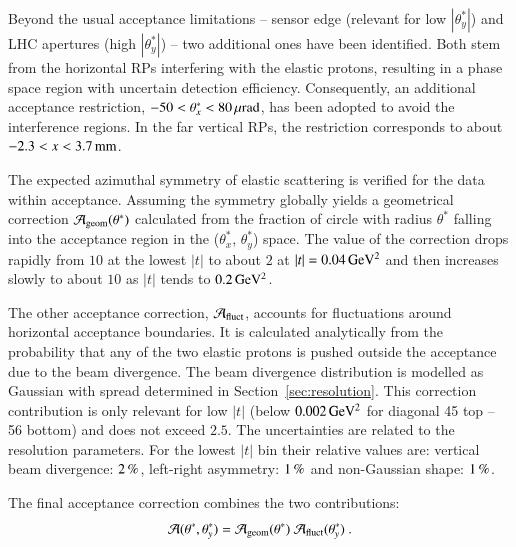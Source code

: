 Beyond the usual acceptance limitations -- sensor edge (relevant for low $|\theta^*_y|$) and LHC apertures (high $|\theta_y^*|$) -- two additional ones have been identified. Both stem from the horizontal RPs interfering with the elastic protons, resulting in a phase space region with uncertain detection efficiency. Consequently, an additional acceptance restriction, $-50 < \theta_x^* < 80\,{\rm \mu rad}$, has been adopted to avoid the interference regions. In the far vertical RPs, the restriction corresponds to about $-2.3 < x < 3.7\,{\rm mm}$.

The expected azimuthal symmetry of elastic scattering is verified for the data within acceptance. Assuming the symmetry globally yields a geometrical correction ${\cal A}_{\rm geom}(\theta^*)$ calculated from the fraction of circle with radius $\theta^*$ falling into the acceptance region in the ($\theta_x^*$, $\theta_y^*$) space. The value of the correction drops rapidly from $10$ at the lowest $|t|$ to about $2$ at $|t| = 0.04\,{\rm GeV^2}$ and then increases slowly to about $10$ as $|t|$ tends to $0.2\,{\rm GeV^2}$.

The other acceptance correction, ${\cal A}_{\rm fluct}$, accounts for fluctuations around horizontal acceptance boundaries. It is calculated analytically from the probability that any of the two elastic protons is pushed outside the acceptance due to the beam divergence. The beam divergence distribution is modelled as Gaussian with spread determined in Section~\ref{sec:resolution}. This correction contribution is only relevant for low $|t|$ (below $0.002\,{\rm GeV^2}$ for diagonal 45 top -- 56 bottom) and does not exceed $2.5$. The uncertainties are related to the resolution parameters. For the lowest $|t|$ bin their relative values are: vertical beam divergence: $2\,{\rm \%}$, left-right asymmetry: $1\,{\rm \%}$ and non-Gaussian shape: $1\,{\rm \%}$.

The final acceptance correction combines the two contributions:
\begin{equation}
{\cal A}(\theta^*, \theta_y^*) = {\cal A}_{\rm geom}(\theta^*)\ {\cal A}_{\rm fluct}(\theta_y^*)\ .
\end{equation}

